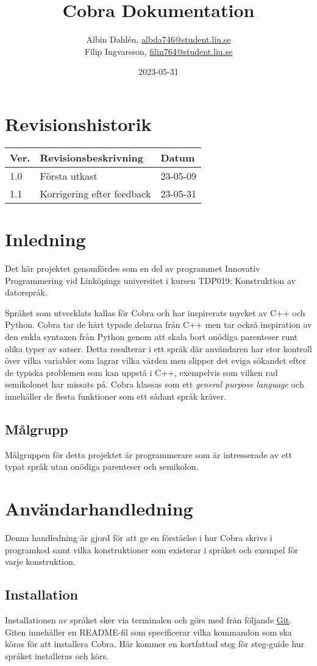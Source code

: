 \documentclass{TDP003mall}
\author{Albin Dahlén, \url{albda746@student.liu.se}\\
Filip Ingvarsson, \url{filin764@student.liu.se}}
\title{Cobra Dokumentation}
\date{2023-05-31}
\begin{document}
\projectpage

\tableofcontents

\section*{Revisionshistorik}
\begin{table}[!ht]
    \begin{tabularx}{\linewidth}{|l|X|l|}
      \hline
      Ver. & Revisionsbeskrivning & Datum \\\hline
      1.0 & Första utkast & 23-05-09 \\\hline
      1.1 & Korrigering efter feedback & 23-05-31 \\\hline
    \end{tabularx}
\end{table}


\newpage

\section{Inledning}
Det här projektet genomfördes som en del av programmet Innovativ Programmering vid Linköpings universitet i kursen TDP019: Konstruktion av datorspråk.

Språket som utvecklats kallas för Cobra och har inspirerats mycket av C++ och Python.
Cobra tar de hårt typade delarna från C++ men tar också inspiration av den enkla syntaxen från Python genom att skala bort onödiga parenteser runt olika typer av satser.
Detta resulterar i ett språk där användaren har stor kontroll över vilka variabler som lagrar vilka värden men slipper det eviga sökandet efter de typiska problemen som kan uppstå i C++, exempelvis som vilken rad semikolonet har missats på.
Cobra klassas som ett \emph{general purpose language} och innehåller de flesta funktioner som ett sådant språk kräver.
\subsection{Målgrupp}
Målgruppen för detta projektet är programmerare som är intresserade av ett typat språk utan onödiga parenteser och semikolon.
\section{Användarhandledning}
Denna handledning är gjord för att ge en förståelse i hur Cobra skrivs i programkod samt vilka konstruktioner som existerar i språket och exempel för varje konstruktion.
\subsection{Installation}
Installationen av språket sker via terminalen och görs med från följande \href{https://gitlab.liu.se/albda746/tdp019}{Git}. Giten innehåller en README-fil som specificerar vilka kommandon som ska köras för att installera Cobra. Här kommer en kortfattad steg för steg-guide hur språket installeras och körs.
\end{document}
